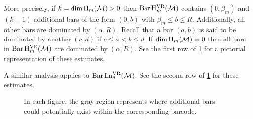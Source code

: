 More precisely,
if \(k = \dim \operatorname{H}_m(\mathcal{M}) > 0\) then $\operatorname{Bar}\mathrm{H}_m^{\mathrm{VR}}(\mathcal{M})$ contains $(0, \beta_m)$ and \((k - 1)\) additional bars of the form \((0, b)\) with \(\beta_m \leq b \leq R\).
Additionally, all other bars are dominated by \((\alpha, R)\).
Recall that a bar $(a, b)$ is said to be dominated by another $(c,d)$ if $c \leq a < b \leq d$.
If \(\dim \operatorname{H}_m(\mathcal{M}) = 0\) then all bars in \(\operatorname{Bar}\mathrm{H}_m^{\mathrm{VR}}(\mathcal{M})\) are dominated by \((\alpha, R)\).
See the first row of \cref{fig:barcodes_general} for a pictorial representation of these estimates.

A similar analysis applies to $\operatorname{Bar}\operatorname{Im}_\theta^{\mathrm{VR}}(\mathcal{M})$.
See the second row of \cref{fig:barcodes_general} for these estimates.

\begin{figure}
	\centering
	
	\caption{In each figure, the gray region represents where additional bars could potentially exist within the corresponding barcode.}
	\label{fig:barcodes_general}
\end{figure}